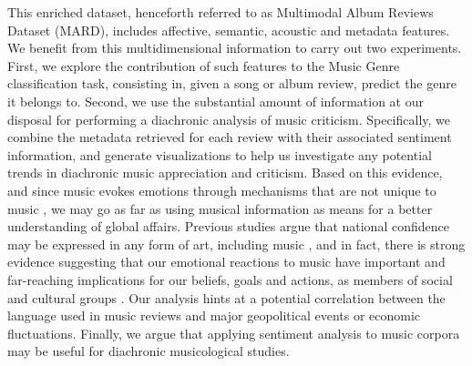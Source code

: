 This enriched dataset, henceforth referred to as Multimodal Album Reviews Dataset (MARD), includes affective, semantic, acoustic and metadata features. %
We benefit from this multidimensional information to carry out two experiments. First, we explore the contribution of such features to the Music Genre classification task, consisting in, given a song or album review, predict the genre it belongs to. %
Second, we use the substantial amount of information at our disposal for performing a diachronic analysis of music criticism. Specifically, we combine the metadata retrieved for each review with their associated sentiment information, and generate visualizations to help us investigate any potential trends in diachronic music appreciation and criticism. Based on this evidence, and since music evokes emotions through mechanisms that are not unique to music \cite{Juslin2008}, we may go as far as using musical information as means for a better understanding of global affairs. Previous studies argue that national confidence may be expressed in any form of art, including music \cite{Moisi2010}, and in fact, there is strong evidence suggesting that our emotional reactions to music have important and far-reaching implications for our beliefs, goals and actions, as members of social and cultural groups \cite{Alcorta2008}. Our analysis hints at a potential correlation between the language used in music reviews and major geopolitical events or economic fluctuations. Finally, we argue that applying sentiment analysis to music corpora may be useful for diachronic musicological studies.






